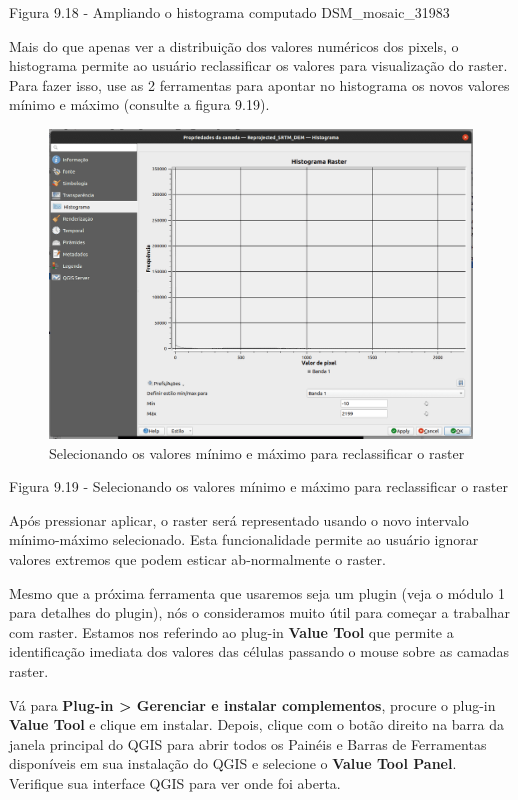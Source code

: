 \documentclass[
]{krantz}
\begin{document}
Figura 9.18 - Ampliando o histograma computado DSM\_mosaic\_31983

Mais do que apenas ver a distribuição dos valores numéricos dos pixels, o histograma permite ao usuário reclassificar os valores para visualização do raster. Para fazer isso, use as 2 ferramentas para apontar no histograma os novos valores mínimo e máximo (consulte a figura 9.19).

\begin{figure}
\centering
\includegraphics{media/modulo9/fig919.png}
\caption{Selecionando os valores mínimo e máximo para reclassificar o raster}
\end{figure}

Figura 9.19 - Selecionando os valores mínimo e máximo para reclassificar o raster

Após pressionar aplicar, o raster será representado usando o novo intervalo mínimo-máximo selecionado. Esta funcionalidade permite ao usuário ignorar valores extremos que podem esticar ab-normalmente o raster.

Mesmo que a próxima ferramenta que usaremos seja um plugin (veja o módulo 1 para detalhes do plugin), nós o consideramos muito útil para começar a trabalhar com raster. Estamos nos referindo ao plug-in \textbf{Value Tool} que permite a identificação imediata dos valores das células passando o mouse sobre as camadas raster.

Vá para \textbf{Plug-in \textgreater{} Gerenciar e instalar complementos}, procure o plug-in \textbf{Value Tool} e clique em instalar. Depois, clique com o botão direito na barra da janela principal do QGIS para abrir todos os Painéis e Barras de Ferramentas disponíveis em sua instalação do QGIS e selecione o \textbf{Value Tool Panel}. Verifique sua interface QGIS para ver onde foi aberta.
\end{document}
